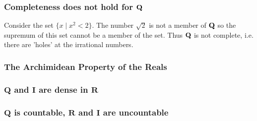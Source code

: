     \subsubsection{Completeness does not hold for $\mathbf{Q}$}
      Consider the set $\{x \mid x^2 < 2\}$. The number $\sqrt{2}$ is not a member of 
      $\mathbf{Q}$ so the supremum of this set cannot be a member of the set. Thus $\mathbf{Q}$ 
      is not complete, i.e. there are 'holes' at the irrational numbers.
    \subsubsection{The Archimidean Property of the Reals}
    \subsubsection{$\mathbf{Q}$ and $\mathbf{I}$ are dense in $\mathbf{R}$}
    \subsubsection{$\mathbf{Q}$ is countable, $\mathbf{R}$ and $\mathbf{I}$ are uncountable}
